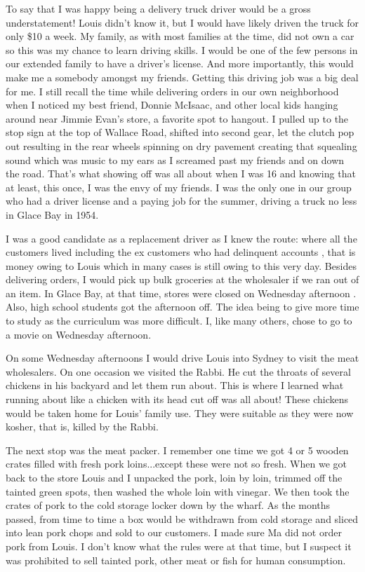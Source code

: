 To say that I was happy being a delivery truck driver would be a gross understatement! Louis didn't know it, but I would have likely driven the truck for only \$10 a week. My family, as with most families at the time, did not own a car so this was my chance to learn driving skills. I would be one of the few persons in our extended family to have a driver's license. And more importantly, this would make me a somebody amongst my friends. Getting this driving job was a big deal for me. I still recall the time while delivering orders in our own neighborhood when I noticed my best friend, Donnie McIsaac, and other local kids hanging around near Jimmie Evan's store, a favorite spot to hangout. I pulled up to the stop sign at the top of Wallace Road, shifted into second gear, let the clutch pop out resulting in the rear wheels spinning on dry pavement creating that squealing sound which was music to my ears as I screamed past my friends and on down the road. That's what showing off was all about when I was 16 and knowing that at least, this once, I was the envy of my friends. I was the only one in our group who had a driver license and a paying job for the summer, driving a truck no less in Glace Bay in 1954.

I was a good candidate as a replacement driver as I knew the route: where all the customers lived including the ex customers who had delinquent accounts , that is money owing to Louis which in many cases is still owing to this very day. Besides delivering orders, I would pick up bulk groceries at the wholesaler if we ran out of an item. In Glace Bay, at that time, stores were closed on Wednesday afternoon . Also, high school students got the afternoon off. The idea being to give more time to study as the curriculum was more difficult. I, like many others, chose to go to a movie on Wednesday afternoon.

On some Wednesday afternoons I would drive Louis into Sydney to visit the meat wholesalers. On one occasion we visited the Rabbi. He cut the throats of several chickens in his backyard and let them run about. This is where I learned what running about like a chicken with its head cut off was all about! These chickens would be taken home for Louis' family use. They were suitable as they were now kosher, that is, killed by the Rabbi.

The next stop was the meat packer. I remember one time we got 4 or 5 wooden crates filled with fresh pork loins...except these were not so fresh. When we got back to the store Louis and I unpacked the pork, loin by loin, trimmed off the tainted green spots, then washed the whole loin with vinegar. We then took the crates of pork to the cold storage locker down by the wharf. As the months passed, from time to time a box would be withdrawn from cold storage and sliced into lean pork chops and sold to our customers. I made sure Ma did not order pork from Louis. I don't know what the rules were at that time, but I suspect it was prohibited to sell tainted pork, other meat or fish for human consumption.


